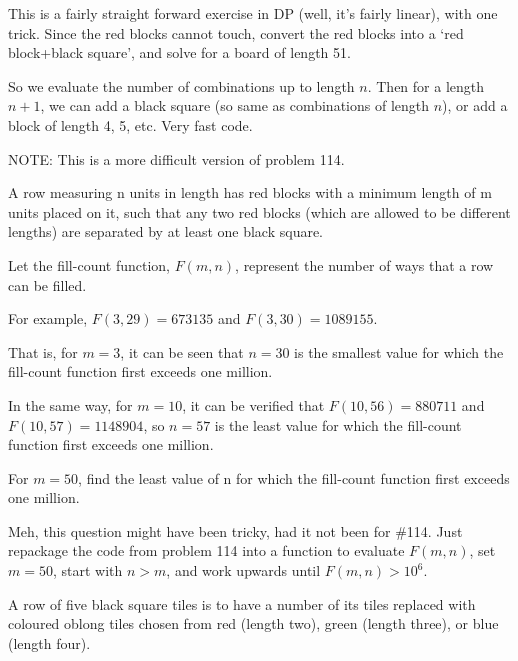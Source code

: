 \normalsize

This is a fairly straight forward exercise in DP (well, it's fairly linear), with one trick.  Since the red blocks cannot touch, convert the red blocks into a `red block+black square', and solve for a board of length 51.

So we evaluate the number of combinations up to length $n$.  Then for a length $n+1$, we can add a black square (so same as combinations of length $n$), or add a block of length 4, 5, etc.  Very fast code.




\footnotesize
NOTE: This is a more difficult version of problem 114.

\normalsize
A row measuring n units in length has red blocks with a minimum length of m units placed on it, such that any two red blocks (which are allowed to be different lengths) are separated by at least one black square.

Let the fill-count function, $F(m, n)$, represent the number of ways that a row can be filled.

For example, $F(3, 29) = 673135$ and $F(3, 30) = 1089155$.

That is, for $m = 3$, it can be seen that $n = 30$ is the smallest value for which the fill-count function first exceeds one million.

In the same way, for $m = 10$, it can be verified that $F(10, 56) = 880711$ and $F(10, 57) = 1148904$, so $n = 57$ is the least value for which the fill-count function first exceeds one million.

For $m = 50$, find the least value of n for which the fill-count function first exceeds one million.

Meh, this question might have been tricky, had it not been for \#114.  Just repackage the code from problem 114 into a function to evaluate $F(m,n)$, set $m = 50$, start with $ n > m$, and work upwards until $F(m,n) > 10^6$.




A row of five black square tiles is to have a number of its tiles replaced with coloured oblong tiles chosen from red (length two), green (length three), or blue (length four).

